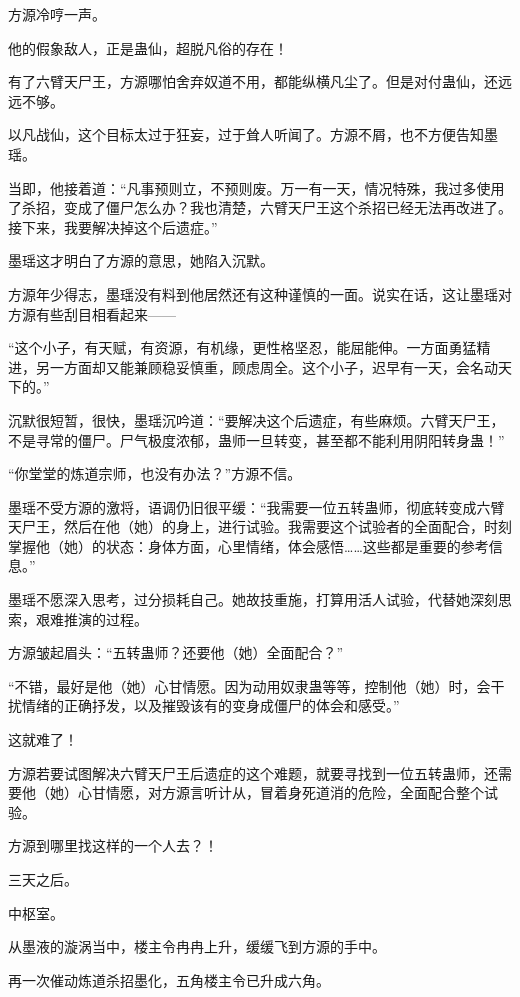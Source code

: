\begin{this_body}
方源冷哼一声。

他的假象敌人，正是蛊仙，超脱凡俗的存在！

有了六臂天尸王，方源哪怕舍弃奴道不用，都能纵横凡尘了。但是对付蛊仙，还远远不够。

以凡战仙，这个目标太过于狂妄，过于耸人听闻了。方源不屑，也不方便告知墨瑶。

当即，他接着道：“凡事预则立，不预则废。万一有一天，情况特殊，我过多使用了杀招，变成了僵尸怎么办？我也清楚，六臂天尸王这个杀招已经无法再改进了。接下来，我要解决掉这个后遗症。”

墨瑶这才明白了方源的意思，她陷入沉默。

方源年少得志，墨瑶没有料到他居然还有这种谨慎的一面。说实在话，这让墨瑶对方源有些刮目相看起来——

“这个小子，有天赋，有资源，有机缘，更性格坚忍，能屈能伸。一方面勇猛精进，另一方面却又能兼顾稳妥慎重，顾虑周全。这个小子，迟早有一天，会名动天下的。”

沉默很短暂，很快，墨瑶沉吟道：“要解决这个后遗症，有些麻烦。六臂天尸王，不是寻常的僵尸。尸气极度浓郁，蛊师一旦转变，甚至都不能利用阴阳转身蛊！”

“你堂堂的炼道宗师，也没有办法？”方源不信。

墨瑶不受方源的激将，语调仍旧很平缓：“我需要一位五转蛊师，彻底转变成六臂天尸王，然后在他（她）的身上，进行试验。我需要这个试验者的全面配合，时刻掌握他（她）的状态：身体方面，心里情绪，体会感悟……这些都是重要的参考信息。”

墨瑶不愿深入思考，过分损耗自己。她故技重施，打算用活人试验，代替她深刻思索，艰难推演的过程。

方源皱起眉头：“五转蛊师？还要他（她）全面配合？”

“不错，最好是他（她）心甘情愿。因为动用奴隶蛊等等，控制他（她）时，会干扰情绪的正确抒发，以及摧毁该有的变身成僵尸的体会和感受。”

这就难了！

方源若要试图解决六臂天尸王后遗症的这个难题，就要寻找到一位五转蛊师，还需要他（她）心甘情愿，对方源言听计从，冒着身死道消的危险，全面配合整个试验。

方源到哪里找这样的一个人去？！

三天之后。

中枢室。

从墨液的漩涡当中，楼主令冉冉上升，缓缓飞到方源的手中。

再一次催动炼道杀招墨化，五角楼主令已升成六角。


\end{this_body}

